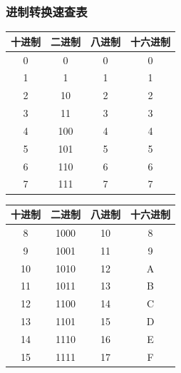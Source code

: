 \begin{frame}
\begin{minipage}{0.58\linewidth}
{\begin{itemize}
              \begin{center}
              \end{center}
            \end{itemize}
        }
    \end{minipage}
\end{frame}


\begin{frame}
    \frametitle{进制转换速查表}
    \begin{minipage}{0.48\linewidth}
        \begin{table}
            \centering
            \begin{tabular}{cccc}
                \toprule
                十进制 & 二进制 & 八进制 & 十六进制 \\ \midrule 
                0 & 0 & 0 & 0 \\
                1 & 1 & 1 & 1 \\
                2 & 10 & 2 & 2 \\
                3 & 11 & 3 & 3 \\
                4 & 100 & 4 & 4 \\
                5 & 101 & 5 & 5 \\
                6 & 110 & 6 & 6 \\
                7 & 111 & 7 & 7 \\ \bottomrule            
            \end{tabular}
        \end{table}
    \end{minipage}\hfill
    \begin{minipage}{0.48\linewidth}
        \begin{table}
            \centering
            \begin{tabular}{cccc}
                \toprule
                十进制 & 二进制 & 八进制 & 十六进制 \\ \midrule 
                8 & 1000 & 10 & 8 \\
                9 & 1001 & 11 & 9 \\
                10 & 1010 & 12 & A \\
                11 & 1011 & 13 & B \\
                12 & 1100 & 14 & C \\
                13 & 1101 & 15 & D \\
                14 & 1110 & 16 & E \\
                15 & 1111 & 17 & F \\ \bottomrule            
            \end{tabular}
        \end{table}
    \end{minipage}
\end{frame}


